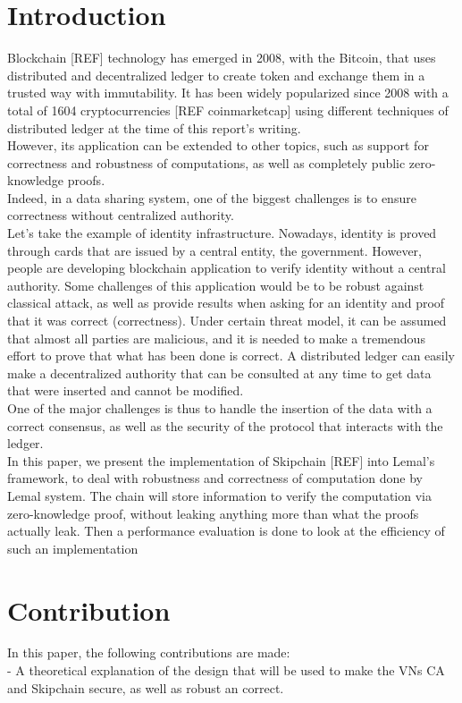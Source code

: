 \documentclass{article}
\begin{document}
\newpage

\tableofcontents

\newpage

\section{Introduction}
Blockchain [REF] technology has emerged in 2008, with the Bitcoin, that uses distributed and decentralized ledger to create token and exchange them in a trusted way with immutability.
It has been widely popularized since 2008 with a total of 1604 cryptocurrencies [REF coinmarketcap] using different techniques of distributed ledger at the time of this report's writing.\\
However, its application can be extended to other topics, such as support for correctness and robustness of computations, as well as completely public zero-knowledge proofs.\\
Indeed, in a data sharing system, one of the biggest challenges is to ensure correctness without centralized authority.\\
Let's take the example of identity infrastructure. Nowadays, identity is proved through cards that are issued by a central entity, the government. However, people are developing blockchain application to verify identity without a central authority. Some challenges of this application would be to be robust against classical attack, as well as provide results when asking for an identity and proof that it was correct (correctness).
Under certain threat model, it can be assumed that almost all parties are malicious, and it is needed to make a tremendous effort to prove that what has been done is correct. A distributed ledger can easily make a decentralized authority that can be consulted at any time to get data that were inserted and cannot be modified.\\
One of the major challenges is thus to handle the insertion of the data with a correct consensus, as well as the security of the protocol that interacts with the ledger.\\
In this paper, we present the implementation of Skipchain [REF] into Lemal's framework, to deal with robustness and correctness of computation done by Lemal system. The chain will store information to verify the computation via zero-knowledge proof, without leaking anything more than what the proofs actually leak. Then a performance evaluation is done to look at the efficiency of such an implementation


\section{Contribution}
In this paper, the following contributions are made:\\
- A theoretical explanation of the design that will be used to make the VNs CA and Skipchain secure, as well as robust an correct.\\
\end{document}
